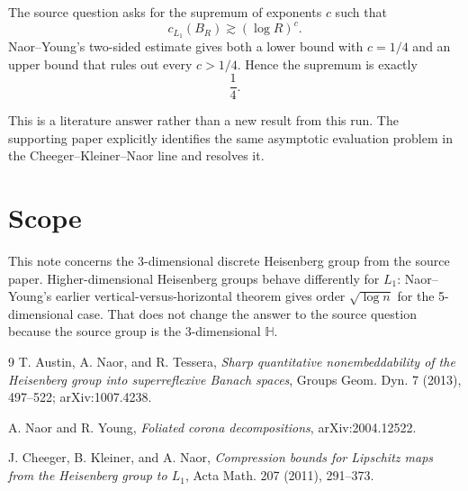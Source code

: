 \documentclass[11pt]{article}
\begin{document}
The source question asks for the supremum of exponents \(c\) such that
\[
c_{L_1}(B_R)\gtrsim (\log R)^c.
\]
Naor--Young's two-sided estimate gives both a lower bound with \(c=1/4\)
and an upper bound that rules out every \(c>1/4\). Hence the supremum is
exactly
\[
\boxed{\frac14}.
\]

This is a literature answer rather than a new result from this run. The
supporting paper explicitly identifies the same asymptotic evaluation problem
in the Cheeger--Kleiner--Naor line and resolves it.

\section*{Scope}

This note concerns the 3-dimensional discrete Heisenberg group from the source
paper. Higher-dimensional Heisenberg groups behave differently for \(L_1\):
Naor--Young's earlier vertical-versus-horizontal theorem gives order
\(\sqrt{\log n}\) for the 5-dimensional case. That does not change the answer
to the source question because the source group is the 3-dimensional
\(\mathbb H\).

\begin{thebibliography}{9}
T. Austin, A. Naor, and R. Tessera,
\emph{Sharp quantitative nonembeddability of the Heisenberg group into
superreflexive Banach spaces},
Groups Geom. Dyn. 7 (2013), 497--522; arXiv:1007.4238.

A. Naor and R. Young,
\emph{Foliated corona decompositions},
arXiv:2004.12522.

J. Cheeger, B. Kleiner, and A. Naor,
\emph{Compression bounds for Lipschitz maps from the Heisenberg group to \(L_1\)},
Acta Math. 207 (2011), 291--373.
\end{thebibliography}
\end{document}
